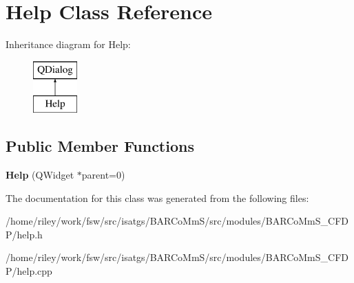 \hypertarget{class_help}{}\section{Help Class Reference}
\label{class_help}
Inheritance diagram for Help\+:\begin{figure}[H]
\begin{center}
\leavevmode
\includegraphics[height=2.000000cm]{class_help}
\end{center}
\end{figure}
\subsection*{Public Member Functions}
\begin{DoxyCompactItemize}
\item 
{\bfseries Help} (Q\+Widget $\ast$parent=0)\hypertarget{class_help_a7359f816eb2dab34e4c7017e36c9654d}{}\label{class_help_a7359f816eb2dab34e4c7017e36c9654d}

\end{DoxyCompactItemize}


The documentation for this class was generated from the following files\+:\begin{DoxyCompactItemize}
\item 
/home/riley/work/fsw/src/isatgs/\+B\+A\+R\+Co\+Mm\+S/src/modules/\+B\+A\+R\+Co\+Mm\+S\+\_\+\+C\+F\+D\+P/help.\+h\item 
/home/riley/work/fsw/src/isatgs/\+B\+A\+R\+Co\+Mm\+S/src/modules/\+B\+A\+R\+Co\+Mm\+S\+\_\+\+C\+F\+D\+P/help.\+cpp\end{DoxyCompactItemize}
